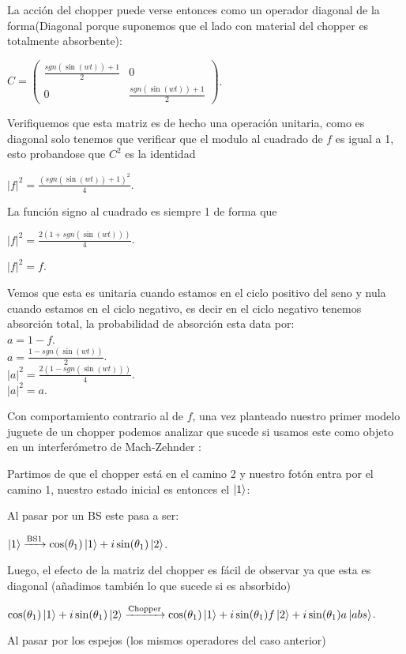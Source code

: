 \documentclass[11pt]{article}
\begin{document}
La acción del chopper
 puede verse entonces como un operador diagonal de la forma(Diagonal porque suponemos que el lado con material del chopper
 es totalmente absorbente):

$C
=\begin
{pmatrix} \frac{sgn
(\sin(wt
))+1}{2} & 0 \\ 0 & \frac{sgn
(\sin(wt
))+1}{2} \end
{pmatrix}$.

Verifiquemos que esta matriz es de hecho una operación unitaria, como es diagonal solo tenemos que verificar que el modulo al cuadrado de $f$
 es igual a 1, esto probandose que $C^2$ es la identidad 

$|f|^2=\frac{(sgn
(\sin(wt
))+1)^2}{4}$.

La función signo al cuadrado es siempre 1 de forma que

$|f|^2=\frac{2(1+sgn
(\sin(wt
)))}{4}$.

$|f|^2=f$.

Vemos que esta es unitaria cuando estamos en el ciclo positivo del seno y nula cuando estamos en el ciclo negativo, es decir en el ciclo negativo tenemos absorción total, la probabilidad de absorción esta data por:
\\
$a
=1-f$.\\
$a
=\frac{1-sgn(\sin(wt
))}{2}$.\\
$|a|^2=\frac{2(1-sgn(\sin(wt
)))}{4}$.\\$|a|^2=a$.

Con comportamiento contrario al de $f$, una vez planteado nuestro primer modelo juguete de un chopper
 podemos analizar que sucede si usamos este como objeto en un interferómetro
 de Mach-Zehnder :

Partimos de que el chopper
 está en el camino 2 y nuestro fotón entra por el camino 1, nuestro estado inicial es entonces el $\ket
{1}$:

Al pasar por un BS este pasa
 a ser:

$\ket{1}\xrightarrow{\text{BS1}}\cos
(\theta_
{1})\ket
{1}+i\sin(\theta_
{1})\ket
{2}$.

Luego, el efecto de la matriz del chopper
 es fácil de observar ya que esta es diagonal (añadimos también lo que sucede si es absorbido)

$\cos
(\theta_
{1})\ket
{1}+i\sin(\theta_
{1})\ket
{2}\xrightarrow{\text{Chopper}}\cos
(\theta_
{1})\ket
{1}+i\sin(\theta_
{1})f\ket
{2}+i\sin(\theta_
{1})a\ket
{abs
}$.

Al pasar por los espejos (los mismos operadores del caso anterior)
\end{document}
